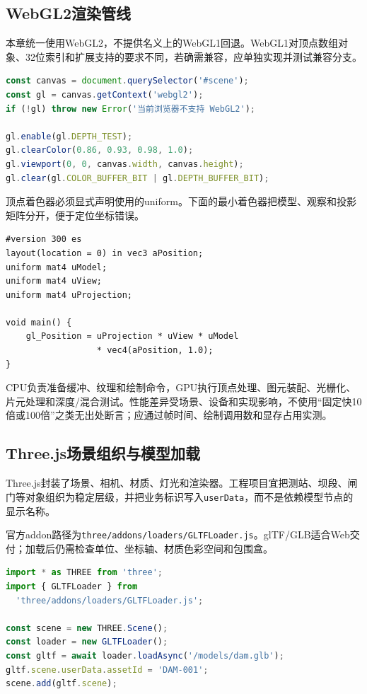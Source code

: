 \subsection{WebGL2渲染管线}

本章统一使用WebGL2，不提供名义上的WebGL1回退。WebGL1对顶点数组对象、32位索引和扩展支持的要求不同，若确需兼容，应单独实现并测试兼容分支。

\begin{lstlisting}[language=JavaScript,breaklines=true]
const canvas = document.querySelector('#scene');
const gl = canvas.getContext('webgl2');
if (!gl) throw new Error('当前浏览器不支持 WebGL2');

gl.enable(gl.DEPTH_TEST);
gl.clearColor(0.86, 0.93, 0.98, 1.0);
gl.viewport(0, 0, canvas.width, canvas.height);
gl.clear(gl.COLOR_BUFFER_BIT | gl.DEPTH_BUFFER_BIT);
\end{lstlisting}

顶点着色器必须显式声明使用的uniform。下面的最小着色器把模型、观察和投影矩阵分开，便于定位坐标错误。

\begin{lstlisting}
#version 300 es
layout(location = 0) in vec3 aPosition;
uniform mat4 uModel;
uniform mat4 uView;
uniform mat4 uProjection;

void main() {
    gl_Position = uProjection * uView * uModel
                  * vec4(aPosition, 1.0);
}
\end{lstlisting}

CPU负责准备缓冲、纹理和绘制命令，GPU执行顶点处理、图元装配、光栅化、片元处理和深度/混合测试。性能差异受场景、设备和实现影响，不使用“固定快10倍或100倍”之类无出处断言；应通过帧时间、绘制调用数和显存占用实测。

\subsection{Three.js场景组织与模型加载}

Three.js封装了场景、相机、材质、灯光和渲染器。工程项目宜把测站、坝段、闸门等对象组织为稳定层级，并把业务标识写入\texttt{userData}，而不是依赖模型节点的显示名称。

官方addon路径为\texttt{three/addons/loaders/GLTFLoader.js}\cite{threeGLTFLoader}。glTF/GLB适合Web交付；加载后仍需检查单位、坐标轴、材质色彩空间和包围盒。

\begin{lstlisting}[language=JavaScript,breaklines=true]
import * as THREE from 'three';
import { GLTFLoader } from
  'three/addons/loaders/GLTFLoader.js';

const scene = new THREE.Scene();
const loader = new GLTFLoader();
const gltf = await loader.loadAsync('/models/dam.glb');
gltf.scene.userData.assetId = 'DAM-001';
scene.add(gltf.scene);
\end{lstlisting}

